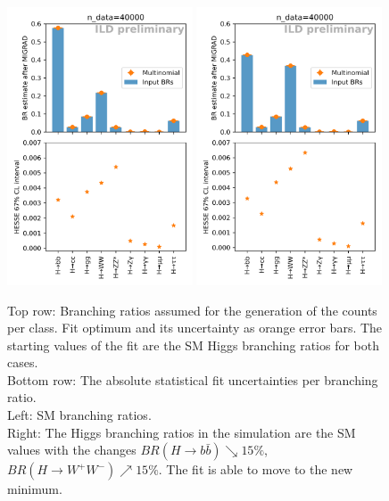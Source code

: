 \documentclass[11pt, hidelinks, a4paper]{scrartcl}
\begin{document}
\begin{figure}[ht]
    \centering
    \includegraphics[width=0.49\textwidth, keepaspectratio]{br_estimates}
    \includegraphics[width=0.49\textwidth, keepaspectratio]{changed_br_estimates}
    \caption{
        Top row: Branching ratios assumed for the generation of the counts per class.
        Fit optimum and its uncertainty as orange error bars.
        The starting values of the fit are
        the SM Higgs branching ratios for both cases.
        \\
        Bottom row: The absolute statistical fit uncertainties per branching ratio.
        \\
        Left: SM branching ratios.
        \\
        Right: The Higgs branching ratios in the simulation are the SM values
        with the changes
        $BR(H \to b \bar{b}) \searrow 15\%$, $BR(H \to W^+W^-) \nearrow 15\%$.
        The fit is able to move to the new minimum.
    }\label{fig:brs}
\end{figure}
\end{document}
